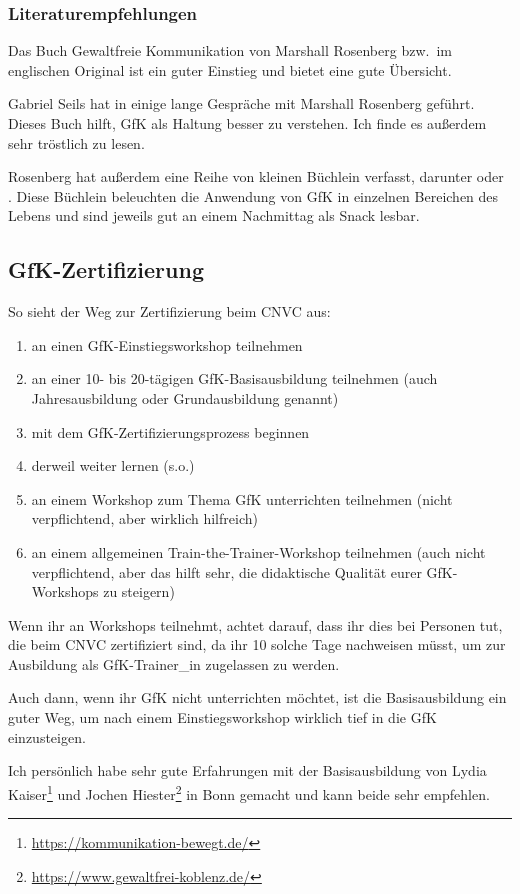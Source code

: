 \subsubsection{Literaturempfehlungen}

Das Buch \glqq Gewaltfreie Kommunikation\grqq{} von Marshall Rosenberg \cite{gfk-rosenberg} bzw.\ im englischen Original \cite{nvc-rosenberg} ist ein guter Einstieg und bietet eine gute Übersicht.

Gabriel Seils hat in \cite{gfk-gespraech} einige lange Gespräche mit Marshall Rosenberg geführt. Dieses Buch hilft, GfK als Haltung besser zu verstehen. Ich finde es außerdem sehr tröstlich zu lesen.

Rosenberg hat außerdem eine Reihe von kleinen Büchlein verfasst, darunter \cite{we-can-work-it-out} oder \cite{being-me-loving-you}. Diese Büchlein beleuchten die Anwendung von GfK in einzelnen Bereichen des Lebens und sind jeweils gut an einem Nachmittag als Snack lesbar.

\subsection{GfK-Zertifizierung}

So sieht der Weg zur Zertifizierung beim CNVC aus:

\begin{enumerate}
    \item an einen GfK-Einstiegsworkshop teilnehmen
    \item an einer 10- bis 20-tägigen GfK-Basisausbildung teilnehmen (auch \glqq Jahresausbildung\grqq{} oder \glqq Grundausbildung\grqq{} genannt)
    \item mit dem GfK-Zertifizierungsprozess\cite{gfk-trainer-werden} beginnen
    \item derweil weiter lernen (s.o.)
    \item an einem Workshop zum Thema \glqq GfK unterrichten\grqq{} teilnehmen (nicht verpflichtend, aber wirklich hilfreich)
    \item an einem allgemeinen Train-the-Trainer-Workshop teilnehmen (auch nicht verpflichtend, aber das hilft sehr, die didaktische Qualität eurer GfK-Workshops zu steigern)
\end{enumerate}

Wenn ihr an Workshops teilnehmt, achtet darauf, dass ihr dies bei Personen tut, die beim CNVC zertifiziert sind, da ihr 10 solche Tage nachweisen müsst, um zur Ausbildung als GfK-Trainer\_in zugelassen zu werden.

Auch dann, wenn ihr GfK nicht unterrichten möchtet, ist die Basisausbildung ein guter Weg, um nach einem Einstiegsworkshop wirklich tief in die GfK einzusteigen.

Ich persönlich habe sehr gute Erfahrungen mit der Basisausbildung von Lydia Kaiser\footnote{\url{https://kommunikation-bewegt.de/}} und Jochen Hiester\footnote{\url{https://www.gewaltfrei-koblenz.de/}} in Bonn gemacht und kann beide sehr empfehlen.
